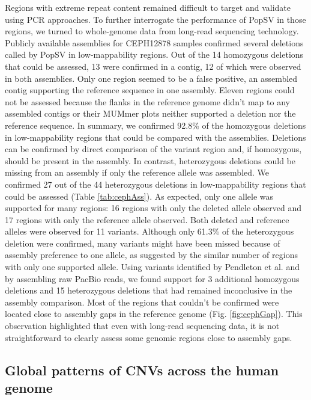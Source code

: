 Regions with extreme repeat content remained difficult to target and validate using PCR approaches.
To further interrogate the performance of {\sf PopSV} in those regions, we turned to whole-genome data from long-read sequencing technology.
Publicly available assemblies for CEPH12878 samples confirmed several deletions called by {\sf PopSV} in low-mappability regions.
Out of the 14 homozygous deletions that could be assessed, 13 were confirmed in a contig, 12 of which were observed in both assemblies\cite{Pendleton2015,Mostovoy2016}.
Only one region seemed to be a false positive, an assembled contig supporting the reference sequence in one assembly.
Eleven regions could not be assessed because the flanks in the reference genome didn't map to any assembled contigs or their MUMmer plots neither supported a deletion nor the reference sequence.
In summary, we confirmed 92.8\% of the homozygous deletions in low-mappability regions that could be compared with the assemblies.
Deletions can be confirmed by direct comparison of the variant region and, if homozygous, should be present in the assembly.
In contrast, heterozygous deletions could be missing from an assembly if only the reference allele was assembled.
We confirmed 27 out of the 44 heterozygous deletions in low-mappability regions that could be assessed (Table \ref{tab:cephAss}).
As expected, only one allele was supported for many regions: 16 regions with only the deleted allele observed and 17 regions with only the reference allele observed.
Both deleted and reference alleles were observed for 11 variants.
Although only 61.3\% of the heterozygous deletion were confirmed, many variants might have been missed because of assembly preference to one allele, as suggested by the similar number of regions with only one supported allele.
Using variants identified by Pendleton et al.\cite{Pendleton2015} and by assembling raw PacBio reads, we found support for 3 additional homozygous deletions and 15 heterozygous deletions that had remained inconclusive in the assembly comparison.
Most of the regions that couldn't be confirmed were located close to assembly gaps in the reference genome (Fig. \ref{fig:cephGap}).
This observation highlighted that even with long-read sequencing data, it is not straightforward to clearly assess some genomic regions close to assembly gaps.

\subsection*{Global patterns of CNVs across the human genome}

